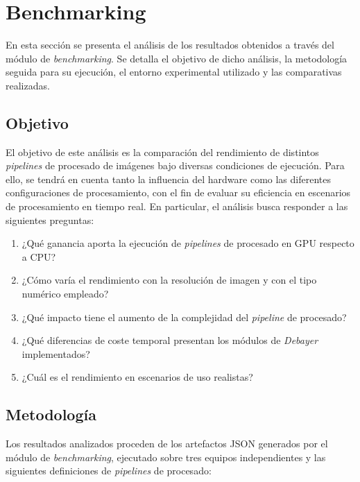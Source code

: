 
\section{Benchmarking} \label{sec:9_benchmarking}
\captionsetup[table]{justification=centering,singlelinecheck=false}
\captionsetup[figure]{justification=centering,singlelinecheck=false}
\newcommand{\thead}[1]{\shortstack[c]{\bfseries #1}}

En esta sección se presenta el análisis de los resultados obtenidos a través del módulo
de \textit{benchmarking}. Se detalla el objetivo de dicho análisis, la metodología seguida para
su ejecución, el entorno experimental utilizado y las comparativas realizadas.

\subsection{Objetivo} \label{sec:9_benchmarking_objective}
El objetivo de este análisis es la comparación del rendimiento de distintos
\textit{pipelines} de procesado de imágenes bajo diversas condiciones de ejecución.
Para ello, se tendrá en cuenta tanto la influencia del hardware como las diferentes configuraciones de procesamiento,
con el fin de evaluar su eficiencia en escenarios de procesamiento en tiempo real.
\noindent En particular, el análisis busca responder a las siguientes preguntas:

\begin{enumerate}[noitemsep]
	\item ¿Qué ganancia aporta la ejecución de \textit{pipelines} de procesado en GPU respecto a CPU?
	\item ¿Cómo varía el rendimiento con la resolución de imagen y con el tipo numérico empleado?
	\item ¿Qué impacto tiene el aumento de la complejidad del \textit{pipeline} de procesado?
	\item ¿Qué diferencias de coste temporal presentan los módulos de \textit{Debayer} implementados?
	\item ¿Cuál es el rendimiento en escenarios de uso realistas?
\end{enumerate}

\subsection{Metodología} \label{sec:9_benchmarking_methodology}
Los resultados analizados proceden de los artefactos JSON generados por el módulo
de \textit{benchmarking}, ejecutado sobre tres equipos
independientes y las siguientes definiciones de \textit{pipelines} de procesado:

